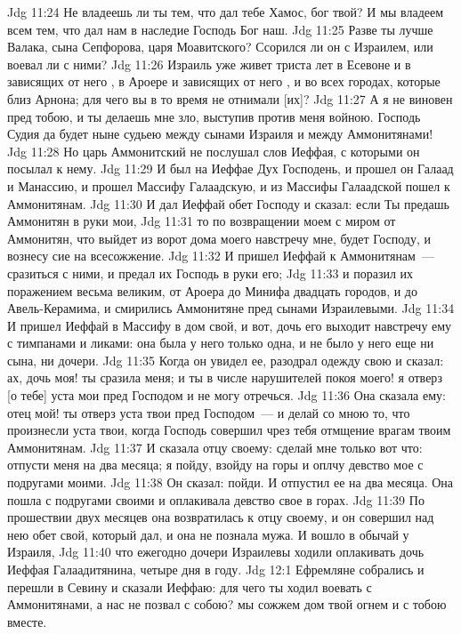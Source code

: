 \vs Jdg 11:24 Не владеешь ли ты тем, что дал тебе Хамос, бог твой? И мы владеем всем тем, что дал нам в наследие Господь Бог наш.
\vs Jdg 11:25 Разве ты лучше Валака, сына Сепфорова, царя Моавитского? Ссорился ли он с Израилем, или воевал ли с ними?
\vs Jdg 11:26 Израиль уже живет триста лет в Есевоне и в зависящих от него , в Ароере и зависящих от него , и во всех городах, которые близ Арнона; для чего вы в то время не отнимали [их]?
\vs Jdg 11:27 А я не виновен пред тобою, и ты делаешь мне зло, выступив против меня войною. Господь Судия да будет ныне судьею между сынами Израиля и между Аммонитянами!
\vs Jdg 11:28 Но царь Аммонитский не послушал слов Иеффая, с которыми он посылал к нему.
\rsbpar\vs Jdg 11:29 И был на Иеффае Дух Господень, и прошел он Галаад и Манассию, и прошел Массифу Галаадскую, и из Массифы Галаадской пошел к Аммонитянам.
\vs Jdg 11:30 И дал Иеффай обет Господу и сказал: если Ты предашь Аммонитян в руки мои,
\vs Jdg 11:31 то по возвращении моем с миром от Аммонитян, что выйдет из ворот дома моего навстречу мне, будет Господу, и вознесу сие на всесожжение.
\vs Jdg 11:32 И пришел Иеффай к Аммонитянам~--- сразиться с ними, и предал их Господь в руки его;
\vs Jdg 11:33 и поразил их поражением весьма великим, от Ароера до Минифа двадцать городов, и до Авель-Керамима, и смирились Аммонитяне пред сынами Израилевыми.
\vs Jdg 11:34 И пришел Иеффай в Массифу в дом свой, и вот, дочь его выходит навстречу ему с тимпанами и ликами: она была у него только одна, и не было у него еще ни сына, ни дочери.
\vs Jdg 11:35 Когда он увидел ее, разодрал одежду свою и сказал: ах, дочь моя! ты сразила меня; и ты в числе нарушителей покоя моего! я отверз [о тебе] уста мои пред Господом и не могу отречься.
\vs Jdg 11:36 Она сказала ему: отец мой! ты отверз уста твои пред Господом~--- и делай со мною то, что произнесли уста твои, когда Господь совершил чрез тебя отмщение врагам твоим Аммонитянам.
\vs Jdg 11:37 И сказала отцу своему: сделай мне только вот что: отпусти меня на два месяца; я пойду, взойду на горы и оплчу девство мое с подругами моими.
\vs Jdg 11:38 Он сказал: пойди. И отпустил ее на два месяца. Она пошла с подругами своими и оплакивала девство свое в горах.
\vs Jdg 11:39 По прошествии двух месяцев она возвратилась к отцу своему, и он совершил над нею обет свой, который дал, и она не познала мужа. И вошло в обычай у Израиля,
\vs Jdg 11:40 что ежегодно дочери Израилевы ходили оплакивать дочь Иеффая Галаадитянина, четыре дня в году.
\vs Jdg 12:1 Ефремляне собрались и перешли в Севину и сказали Иеффаю: для чего ты ходил воевать с Аммонитянами, а нас не позвал с собою? мы сожжем дом твой огнем и с тобою вместе.
